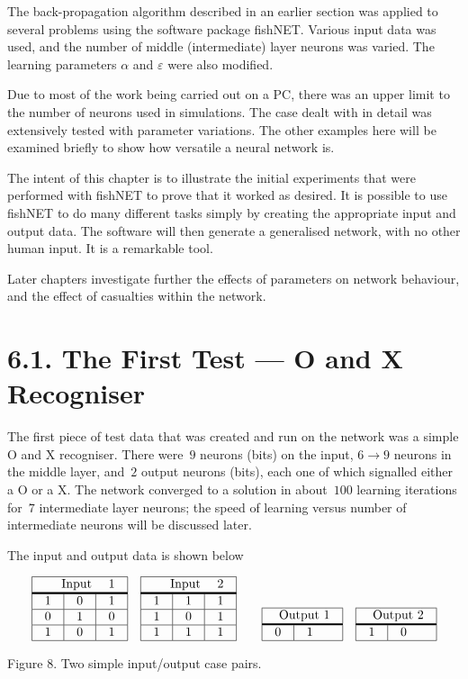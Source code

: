 \documentclass[12pt]{report}
\begin{document}
The back-propagation algorithm described in an earlier section was
applied to several problems using the software package fishNET.
Various input data was used, and the number of middle (intermediate)
layer neurons was varied.
The learning parameters $\alpha$ and $\varepsilon$ were also
modified.

Due to most of the work being carried out on a PC, there was an
upper limit to the number of neurons used in simulations.
The case dealt with in detail was extensively tested with parameter
variations.
The other examples here will be examined briefly to show how
versatile a neural network is.

The intent of this chapter is to illustrate
the initial experiments that were performed with fishNET to
prove that it worked as desired.
It is possible to use fishNET to do many different tasks simply by creating
the appropriate input and output data.
The software will then generate a generalised network, with no other
human input.
It is a remarkable tool.

Later chapters investigate further the effects of parameters on
network behaviour, and the effect of casualties within the network.

\section{6.1. The First Test --- O and X Recogniser}

The first piece of test data that was created and run on the network
was a simple O and X recogniser.
There were~$9$ neurons (bits) on the input, $6 \to 9$ neurons in the middle
layer, and~$2$ output neurons (bits), each one of which signalled either a O
or a X.
The network converged to a solution in about~$100$ learning
iterations for~$7$ intermediate layer neurons; the speed of learning
versus number of intermediate neurons will be discussed later.

The input and output data is shown below

$$
\vbox{\tabskip=0pt \offinterlineskip
\halign{\strut#& \vrule#\tabskip=1em plus2em& #& \vrule#&
 #& \vrule#& #& \vrule#\tabskip=0pt\cr\noalign{\hrule}
&&\multispan5 Input 1&\cr\noalign{\hrule height1.5pt}
&&1&&0&&1&\cr\noalign{\hrule}
&&0&&1&&0&\cr\noalign{\hrule}
&&1&&0&&1&\cr\noalign{\hrule}
}}
\quad\vbox{\tabskip=0pt \offinterlineskip
\halign{\strut#& \vrule#\tabskip=1em plus2em& #& \vrule#&
 #& \vrule#& #& \vrule#\tabskip=0pt\cr\noalign{\hrule}
&&\multispan5 Input 2&\cr\noalign{\hrule height1.5pt}
&&1&&1&&1&\cr\noalign{\hrule}
&&1&&0&&1&\cr\noalign{\hrule}
&&1&&1&&1&\cr\noalign{\hrule}
}}
\qquad\vbox{\tabskip=0pt \offinterlineskip
\halign{\strut#& \vrule#\tabskip=1em plus2em& #& \vrule#&
 #& \vrule#\tabskip=0pt\cr\noalign{\hrule}
&&\multispan3 Output 1&\cr\noalign{\hrule height1.5pt}
&&0&&1&\cr\noalign{\hrule}
}}
\quad\vbox{\tabskip=0pt \offinterlineskip
\halign{\strut#& \vrule#\tabskip=1em plus2em& #& \vrule#&
 #& \vrule#\tabskip=0pt\cr\noalign{\hrule}
&&\multispan3 Output 2&\cr\noalign{\hrule height1.5pt}
&&1&&0&\cr\noalign{\hrule}
}}
$$
{Figure 8. Two simple input/output case pairs.}
\end{document}
